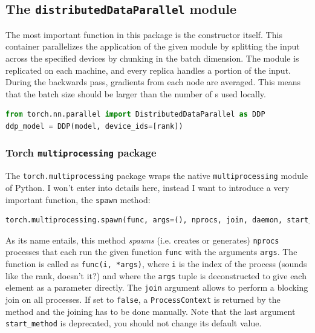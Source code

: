 \documentclass{article}
\begin{document}
\subsection{The \texorpdfstring{\lstinline{distributedDataParallel}}{distributedDataParallel} module}
The most important function in this package is the constructor itself. This container parallelizes the application of the given module by splitting the input across the specified devices by chunking in the batch dimension. The module is replicated on each machine, and every replica handles a portion of the input. During the backwards pass, gradients from each node are averaged. This means that the batch size should be larger than the number of s used locally.

\begin{lstlisting}[language=Python]
from torch.nn.parallel import DistributedDataParallel as DDP
ddp_model = DDP(model, device_ids=[rank])
\end{lstlisting}

\subsubsection{Torch \texorpdfstring{\lstinline{multiprocessing}}{multiprocessing} package}
The \lstinline{torch.multiprocessing} package wraps the native \lstinline{multiprocessing} module of Python. I won't enter into details here, instead I want to introduce a very important function, the \lstinline{spawn} method:
\begin{lstlisting}[language=Python]
torch.multiprocessing.spawn(func, args=(), nprocs, join, daemon, start_method='spawn')
\end{lstlisting}
As its name entails, this method \textit{spawns} (i.e. creates or generates) \lstinline{nprocs} processes that each run the given function \lstinline{func} with the arguments \lstinline{args}. The function is called as \lstinline{func(i, *args)}, where \lstinline{i} is the index of the process (sounds like the rank, doesn't it?) and where the \lstinline{args} tuple is deconstructed to give each element as a parameter directly. The \lstinline{join} argument allows to perform a blocking join on all processes. If set to \lstinline{false}, a \lstinline{ProcessContext} is returned by the method and the joining has to be done manually. Note that the last argument \lstinline{start_method} is deprecated, you should not change its default value.
\end{document}
